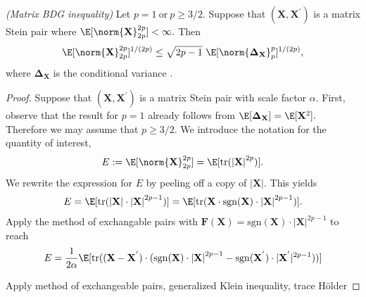 \begin{theorem}
  \emph{(Matrix BDG inequality)}
  Let
  $
    p = 1
    \ 
    \text{or}\ 
    p \ge 3/2
    .
  $
  Suppose that 
  $
  (
    \mathbf{X}
   , 
   \mathbf{X}^{'}
  )
  $
  is a matrix Stein pair where
  $
   \E
   [ 
    \norm{\mathbf{X}}
    _{2p}^{2p}
   ]
   <
   \infty
   .
  $
  Then
  \begin{gather}
   \E
   [ 
    \norm{\mathbf{X}}
    _{2p}^{2p}
   ]
   ^{1/(2p)}
   \le
   \sqrt{2p - 1}
   \ 
   \E
   [ 
    \norm{\mathbf{\Delta_X}}
    _{p}^{p}
   ]
   ^{1/(2p)}
   ,
  \end{gather}
  where 
  $
    \mathbf{\Delta_X}
  $
  is the conditional variance
  .
\end{theorem}
\begin{proof}
  \emph{\cite[§7.3]{Mackey2014}}
  Suppose that
  $
  (
    \mathbf{X}
    ,
    \mathbf{X}^{'}
  )
  $
  is a matrix Stein pair with scale factor $\alpha.$
  First, observe that the result for $p=1$ already follows from 
  $
    \E[\mathbf{\Delta_X}]
    =
    \E[\mathbf{X}^2]
    .
  $
  Therefore we may assume that $p\ge 3/2.$
  We introduce the notation for the quantity of interest,
  \begin{gather}
    E
    :=
    \E[
    \norm{\mathbf{X}}_{2p}^{2p}
    ]
    =
    \E
    [
    \mathrm{tr}
    (
    \left| \mathbf{X} \right|^{2p}
    )
    ].
  \end{gather}
  We rewrite the expression for $E$
  by peeling off a copy of $\left| \mathbf{X} \right|.$
  This yields
  \begin{gather}
    E
    =
    \E
    [
    \mathrm{tr}
    (
    \left| \mathbf{X} \right|
    \cdot
    \left| \mathbf{X} \right|^{2p-1}
    )
    ]
    =
    \E
    [
    \mathrm{tr}
    (
    \mathbf{X}
    \cdot
    \mathrm{sgn}
    (
      \mathbf{X}
    )
    \cdot
    \left| \mathbf{X} \right|^{2p-1}
    )
    ]
    .
  \end{gather}
  Apply the method of exchangable pairs with 
  $
    \mathbf{F}
    (\mathbf{X})
    =
    \mathrm{sgn}
    (\mathbf{X})
    \cdot
    \left| \mathbf{X} \right|^{2p-1}
  $
  to reach
  \begin{gather}
    E
    =
    \frac{1}{2\alpha}
    \E
    [
    \mathrm{tr}
    (
    (
    \mathbf{X}
    -
    \mathbf{X}^{'}
    )
    \cdot
    (
    \mathrm{sgn}
    (
      \mathbf{X}
    )
    \cdot
    \left| \mathbf{X} \right|^{2p-1}
    -
    \mathrm{sgn}
    (
    \mathbf{X}^{'}
    )
    \cdot
    | \mathbf{X}^{'} |^{2p-1}
    )
    )
    ]
  \end{gather}



  Apply method of exchangeable pairs,
  generalized Klein inequality,
  trace Hölder
\end{proof}





